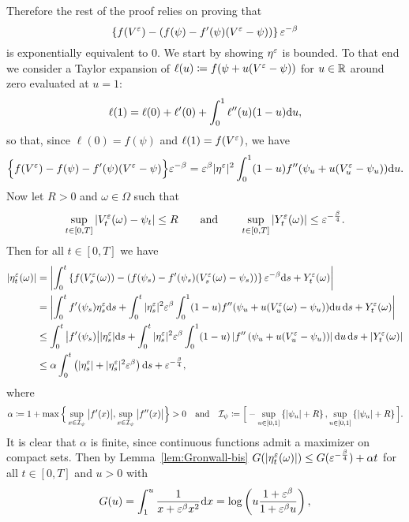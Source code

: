 Therefore the rest of the proof relies on proving that 
\[
\left\{f(V^\varepsilon) - \left(f(\psi) - f'(\psi)(V^\varepsilon -\psi)\right)\right\}\varepsilon^{-\beta}
\]
is exponentially equivalent to $0$. %
We start by showing $\eta^\varepsilon$ is bounded. To that end we consider a Taylor expansion of $\ell(u) \coloneqq f(\psi+u(V^\varepsilon - \psi))$ for $u\in\mathbb{R}$ around zero evaluated at $u=1$:
\[
\ell(1)=\ell(0)+\ell'(0) + \int_0^1 \ell''(u)(1-u)\mathrm{d} u,
\]
so that, since $\ell(0)=f(\psi)$ and $\ell(1)=f(V^\varepsilon)$, we have 
\[
\Big\{f(V^\varepsilon) - f(\psi) - f'(\psi)(V^\varepsilon -\psi)\Big\}\varepsilon^{-\beta}
= \varepsilon^\beta |\eta^\varepsilon|^2 \int_0^1 (1-u)f''(\psi_u + u (V^\varepsilon_u - \psi_u))\mathrm{d} u.
\]
Now let $R>0$ and $\omega \in \Omega$ such that 
\[
\sup_{t \in [0,T]}|V_t^\varepsilon(\omega) - \psi_t|\leq R
\qquad\text{and}\qquad 
\sup_{t \in [0,T]}|Y^\varepsilon_t(\omega)| \leq \varepsilon^{-\frac{\beta}{4}}.
\]
Then for all $t\in[0,T]$ we have
\begin{align*}
\left|\eta_{t}^\varepsilon(\omega)\right| &= \left\lvert \int_0^t\left\{f(V^\varepsilon_s(\omega)) - \left(f(\psi_s) - f'(\psi_s)(V_s^\varepsilon(\omega) -\psi_s)\right)\right\}\varepsilon^{-\beta}\mathrm{d} s + Y^{\varepsilon}_t(\omega)\right\rvert \\
&= \left\lvert\int_0^t f'(\psi_s)\eta_{s}^\varepsilon\mathrm{d} s + \int_0^t|\eta_{s}^\varepsilon|^2\varepsilon^{\beta} \int_0^1(1-u)f''(\psi_u + u(V^\varepsilon_u(\omega) - \psi_u))\mathrm{d} u\,\mathrm{d} s + Y_t^\varepsilon(\omega)\right\rvert \\
&\leq \int_0^t\big|f'(\psi_s)\big| |\eta_{s}^\varepsilon|\mathrm{d} s + \int_0^t|\eta_{s}^\varepsilon|^2\varepsilon^{\beta} \int_0^1(1-u)\left|f''\left(\psi_u + u(V^\varepsilon_u - \psi_u)\right)\right|\mathrm{d} u\,\mathrm{d} s + \left|Y_t^\varepsilon(\omega)\right|\\
&\leq \alpha \int_0^t\left(|\eta_{s}^\varepsilon| + |\eta_{s}^\varepsilon|^2\varepsilon^{\beta}\right) \mathrm{d} s + \varepsilon^{-\frac{\beta}{4}},
\end{align*}
where 
$$
\alpha \coloneqq 1+\max\Big\{\sup_{x \in \mathcal{I}_\psi}\big|f'(x)\big|, \sup_{x\in \mathcal{I}_\psi}\big|f''(x)\big| \Big\}>0 
\quad \text{and} \quad \mathcal{I}_\psi \coloneqq  \Big[-\sup_{u \in [0,1]}\left\{|\psi_u|+ R\right\},\sup_{u \in [0,1]}\left\{|\psi_u| + R\right\}\Big].
$$
It is clear that $\alpha$ is finite, since continuous functions admit a maximizer on compact sets. Then by Lemma~\ref{lem:Gronwall-bis} $G(|\eta_{t}^\varepsilon(\omega)|) \leq G(\varepsilon^{-\frac{\beta}{4}}) + \alpha t$ for all $t \in [0,T]$ and $u>0$ with 
$$
G(u) = \int_1^u\frac{1}{x + \varepsilon^\beta x^2}\mathrm{d} x = \log\left(u\frac{1+\varepsilon^\beta}{1 + \varepsilon^\beta u}\right),
$$

